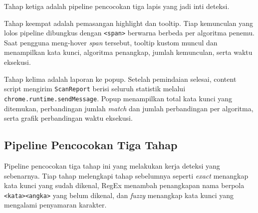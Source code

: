\documentclass[11pt,a4paper]{article}
\begin{document}
Tahap ketiga adalah pipeline pencocokan tiga lapis yang jadi inti deteksi. 

Tahap keempat adalah pemasangan highlight dan tooltip. Tiap kemunculan yang lolos pipeline dibungkus dengan \texttt{<span>}
berwarna berbeda per algoritma penemu. Saat pengguna meng-hover \textit{span} tersebut, tooltip kustom muncul dan menampilkan
kata kunci, algoritma penangkap, jumlah kemunculan, serta waktu eksekusi.

Tahap kelima adalah laporan ke popup. Setelah pemindaian selesai, content script mengirim \texttt{ScanReport} berisi seluruh
statistik melalui \texttt{chrome.runtime.sendMessage}. Popup menampilkan total kata kunci yang ditemukan, perbandingan jumlah
\textit{match} dan jumlah perbandingan per algoritma, serta grafik perbandingan waktu eksekusi.

\subsection{Pipeline Pencocokan Tiga Tahap}
\label{sec:matching-pipeline}

Pipeline pencocokan tiga tahap ini yang melakukan kerja deteksi yang sebenarnya. Tiap tahap melengkapi tahap sebelumnya seperti 
\textit{exact} menangkap kata kunci yang sudah dikenal, RegEx menambah penangkapan nama berpola \texttt{<kata><angka>} yang
belum dikenal, dan \textit{fuzzy} menangkap kata kunci yang mengalami penyamaran karakter.
\end{document}
